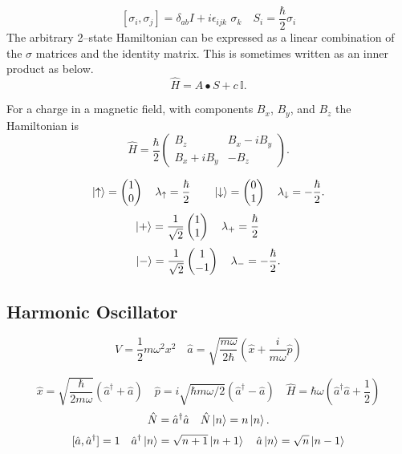 \documentclass{article}
\begin{document}
      \[ 
      [\sigma_i,\sigma_j] = \delta_{a b}I + i \epsilon_{ijk}\,\,\sigma_k \quad
      S_i = \frac{\hbar}{2}\sigma_i 
    \]
    The arbitrary 2--state Hamiltonian can be expressed as a linear combination
    of the $\sigma$ matrices and the identity matrix. This is sometimes written
    as an inner product as below.
    \[
      \hat{H} = A \bullet S + c\,\mathbb{I}
    .\] 

    For a charge in a magnetic field, with components $B_x$, $B_y$, and $B_z$
    the Hamiltonian is  \[
      \hat{H} =\frac{\hbar}{2} 
      \begin{pmatrix}
        B_z & B_x - i B_y \\ 
        B_x + i B_y  & - B_z
      \end{pmatrix}
    .\] 


      \[
      \ket{\uparrow} =
      \begin{pmatrix}
        1 \\ 
        0
      \end{pmatrix}
      \quad \lambda_\uparrow = \frac{\hbar}{2} \qquad
      \ket{\downarrow} = 
      \begin{pmatrix}
        0 \\ 
        1
      \end{pmatrix} \quad
      \lambda_\downarrow = -\frac{\hbar}{2}
      .\] 
      \[
      \ket{+} = \frac{1}{\sqrt 2}
      \begin{pmatrix}
        1 \\ 
        1
      \end{pmatrix}
      \quad \lambda_+= \frac{\hbar}{2} \qquad
    \]
    \[
      \ket{-} = \frac{1}{\sqrt 2}
      \begin{pmatrix}
        1 \\ 
        -1
      \end{pmatrix} \quad
      \lambda_-= -\frac{\hbar}{2}
      .\] 
      




    \subsection*{Harmonic Oscillator} 
      \[
        V = \frac{1}{2} m \omega^2 x^2 \quad 
        \hat{a} = \sqrt{\frac{m \omega}{2 \hbar}}( \hat{x} + \frac{i}{m \omega}\hat{p})
      \]

      \[
        \hat{x} = \sqrt{\frac{\hbar}{2 m \omega}}(\hat{a}^\dagger + \hat{a}) \quad
        \hat{p} = i \sqrt{\hbar m \omega /2 }(\hat{a}^\dagger - \hat{a}) \quad
        \hat{H} = \hbar \omega(\hat{a}^\dagger\hat{a} + \frac{1}{2})
      \]
      \[
      \hat{N} = \hat{a}^\dagger \hat{a} \quad \hat{N} \ket{n} = n \ket{n} 
      .\]  
      \[
        [\hat{a},\hat{a}^\dagger] = 1 \quad
        \hat{a}^\dagger \ket{n} = \sqrt{n + 1} \ket{n+1} \quad
        \hat{a} \ket{n} = \sqrt{n}\ket{n-1}
      \]
  
\end{document}
